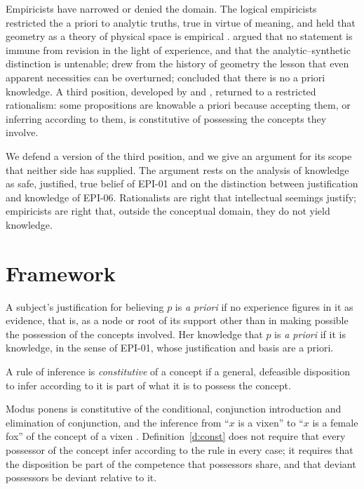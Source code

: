 \documentclass{situationist-preprint}
\begin{document}
Empiricists have narrowed or denied the domain. The logical empiricists restricted the a priori to analytic truths, true in virtue of meaning, and held that geometry as a theory of physical space is empirical \citep{Reichenbach1958}. \citet{Quine1951} argued that no statement is immune from revision in the light of experience, and that the analytic--synthetic distinction is untenable; \citet{Putnam1962} drew from the history of geometry the lesson that even apparent necessities can be overturned; \citet{Devitt2005} concluded that there is no a priori knowledge. A third position, developed by \citet{Boghossian1996} and \citet{Peacocke1992}, returned to a restricted rationalism: some propositions are knowable a priori because accepting them, or inferring according to them, is constitutive of possessing the concepts they involve.

We defend a version of the third position, and we give an argument for its scope that neither side has supplied. The argument rests on the analysis of knowledge as safe, justified, true belief of EPI-01 and on the distinction between justification and knowledge of EPI-06. Rationalists are right that intellectual seemings justify; empiricists are right that, outside the conceptual domain, they do not yield knowledge.

\section{Framework}

\begin{definition}\label{d:apriori}
A subject's justification for believing $p$ is \emph{a priori} if no experience figures in it as evidence, that is, as a node or root of its support other than in making possible the possession of the concepts involved. Her knowledge that $p$ is \emph{a priori} if it is knowledge, in the sense of EPI-01, whose justification and basis are a priori.
\end{definition}

\begin{definition}\label{d:const}
A rule of inference is \emph{constitutive} of a concept if a general, defeasible disposition to infer according to it is part of what it is to possess the concept.
\end{definition}

Modus ponens is constitutive of the conditional, conjunction introduction and elimination of conjunction, and the inference from \enquote{$x$ is a vixen} to \enquote{$x$ is a female fox} of the concept of a vixen \citep{Peacocke1992}. Definition~\ref{d:const} does not require that every possessor of the concept infer according to the rule in every case; it requires that the disposition be part of the competence that possessors share, and that deviant possessors be deviant relative to it.
\end{document}
